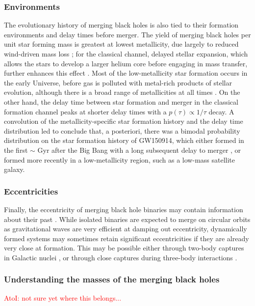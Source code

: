 \documentclass[iop,onecolumn]{revtex4}
\newcommand{\ajf}[1]{\textcolor{red}{AtoI: #1}}
\begin{document}
\subsubsection{Environments}
The evolutionary history of merging black holes is also tied to their formation environments and delay times before merger.  
The yield of merging black holes per unit star forming mass is greatest at lowest metallicity, due largely to reduced wind-driven mass loss \citep[e.g.,][]{Belczynski:2010}; for the classical channel, delayed stellar expansion, which allows the stars to develop a larger helium core before engaging in mass transfer, further enhances this effect \citep[e.g.,][]{Stevenson:2017}.  Most of the low-metallicity star formation occurs in the early Universe, before gas is polluted with metal-rich products of stellar evolution, although there is a broad range of metallicities at all times \citep[e.g.,][]{LangerNorman:2006,TaylorKobayashi:2015}.  On the other hand, the delay time between star formation and merger in the classical formation channel peaks at shorter delay times with a $p(\tau) \propto 1/\tau$ decay.  A convolution of the metallicity-specific star formation history and the delay time distribution led \citet{Belczynski:2016} to conclude that, a posteriori, there was a bimodal probability distribution on the star formation history of GW150914, which either formed in the first $\sim$ Gyr after the Big Bang with a long subsequent delay to merger \citep{Dominik:2014}, or formed more recently in a low-metallicity region, such as a low-mass satellite galaxy.  

\subsubsection{Eccentricities}
Finally, the eccentricity of merging black hole binaries may contain information about their past \citep{MandelOShaughnessy:2010}.  While isolated binaries are expected to merge on circular orbits as gravitational waves are very efficient at damping out eccentricity, dynamically formed systems may sometimes retain significant eccentricities if they are already very close at formation.  This may be possible either through two-body captures in Galactic nuclei \citep{OLeary:2008} \citet[but see][]{Tsang:2013}, or through close captures during three-body interactions \citep{Samsing:2014, Rodriguez:2018}.

\subsubsection{Understanding the masses of the merging black holes}
\ajf{not sure yet where this belongs...}
\end{document}
